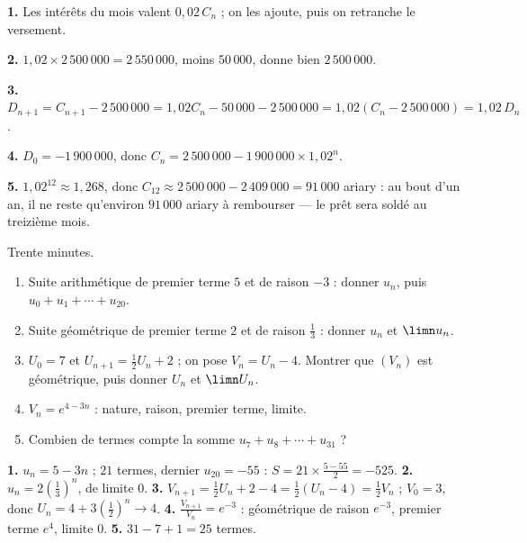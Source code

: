 \begin{corrige}
\textbf{1.} Les intérêts du mois valent $0{,}02\,C_{n}$ ; on les ajoute,
puis on retranche le versement.

\textbf{2.} $1{,}02\times2\,500\,000 = 2\,550\,000$, moins $50\,000$, donne
bien $2\,500\,000$.

\textbf{3.} $D_{n+1} = C_{n+1}-2\,500\,000 = 1{,}02C_{n}-50\,000-2\,500\,000
= 1{,}02\left(C_{n}-2\,500\,000\right) = 1{,}02\,D_{n}$.

\textbf{4.} $D_{0} = -1\,900\,000$, donc
$C_{n} = 2\,500\,000-1\,900\,000\times1{,}02^{n}$.

\textbf{5.} $1{,}02^{12} \approx 1{,}268$, donc
$C_{12} \approx 2\,500\,000-2\,409\,000 = 91\,000$ ariary : au bout d'un an,
il ne reste qu'environ $91\,000$ ariary à rembourser — le prêt sera soldé au
treizième mois.
\end{corrige}

\begin{jemeteste}
Trente minutes.

\begin{enumerate}[label=\textbf{\arabic*.}, leftmargin=*, itemsep=0.3em]
  \item Suite arithmétique de premier terme $5$ et de raison $-3$ : donner
        $u_{n}$, puis $u_{0}+u_{1}+\cdots+u_{20}$.
  \item Suite géométrique de premier terme $2$ et de raison $\frac13$ :
        donner $u_{n}$ et $\limn u_{n}$.
  \item $U_{0} = 7$ et $U_{n+1} = \frac12U_{n}+2$ ; on pose
        $V_{n} = U_{n}-4$. Montrer que $\left(V_{n}\right)$ est géométrique,
        puis donner $U_{n}$ et $\limn U_{n}$.
  \item $V_{n} = e^{4-3n}$ : nature, raison, premier terme, limite.
  \item Combien de termes compte la somme $u_{7}+u_{8}+\cdots+u_{31}$ ?
\end{enumerate}
\end{jemeteste}

\begin{corrige}[je me teste]
\textbf{1.} $u_{n} = 5-3n$ ; $21$ termes, dernier $u_{20} = -55$ :
$S = 21\times\frac{5-55}{2} = -525$.
\textbf{2.} $u_{n} = 2\left(\frac13\right)^{n}$, de limite $0$.
\textbf{3.} $V_{n+1} = \frac12U_{n}+2-4 = \frac12\left(U_{n}-4\right)
= \frac12V_{n}$ ; $V_{0} = 3$, donc
$U_{n} = 4+3\left(\frac12\right)^{n} \to 4$.
\textbf{4.} $\frac{V_{n+1}}{V_{n}} = e^{-3}$ : géométrique de raison
$e^{-3}$, premier terme $e^{4}$, limite $0$.
\textbf{5.} $31-7+1 = 25$ termes.
\end{corrige}

